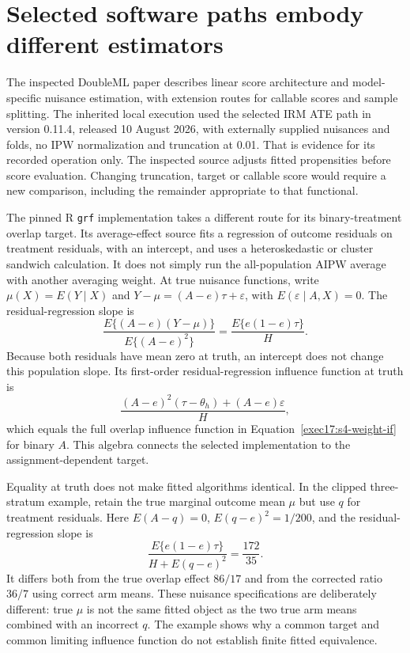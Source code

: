 \section{Selected software paths embody different estimators}
\label{exec17:s4-paths}

The inspected DoubleML paper describes linear score architecture and
model-specific nuisance estimation, with extension routes for callable scores
and sample splitting. The inherited local execution used the selected IRM
ATE path in version 0.11.4, released 10 August 2026, with externally supplied
nuisances and folds, no IPW normalization and truncation at 0.01. That is
evidence for its recorded operation only. The inspected source adjusts fitted
propensities before score evaluation. Changing truncation, target or callable
score would require a new comparison, including the remainder appropriate to
that functional.~\citep{doubleml2022,runtime_doubleml_scope,exec17_s4_paths}

The pinned R \texttt{grf} implementation takes a different route for its
binary-treatment overlap target. Its average-effect source fits a regression
of outcome residuals on treatment residuals, with an intercept, and uses a
heteroskedastic or cluster sandwich calculation. It does not simply run the
all-population AIPW average with another averaging weight. At true nuisance
functions, write $\mu(X)=E(Y\mid X)$ and
$Y-\mu=(A-e)\tau+\varepsilon$, with $E(\varepsilon\mid A,X)=0$.
The residual-regression slope is
\[
 \frac{E\{(A-e)(Y-\mu)\}}{E\{(A-e)^2\}}
       =\frac{E\{e(1-e)\tau\}}{H}.
\]
Because both residuals have mean zero at truth, an intercept does not change
this population slope. Its first-order residual-regression influence function
at truth is
\[
 \frac{(A-e)^2(\tau-\theta_h)+(A-e)\varepsilon}{H},
\]
which equals the full overlap influence function in
Equation~\eqref{exec17:s4-weight-if} for binary $A$.
This algebra connects the selected implementation to the assignment-dependent
target.~\citep{exec13_grf_rpath,exec17_s4_math}

Equality at truth does not make fitted algorithms identical. In the clipped
three-stratum example, retain the true marginal outcome mean $\mu$ but use
$q$ for treatment residuals. Here $E(A-q)=0$,
$E(q-e)^2=1/200$, and the residual-regression slope is
\[
 \frac{E\{e(1-e)\tau\}}{H+E(q-e)^2}=\frac{172}{35}.
\]
It differs both from the true overlap effect $86/17$ and from the corrected
ratio $36/7$ using correct arm means. These nuisance specifications are
deliberately different: true $\mu$ is not the same fitted object as the two
true arm means combined with an incorrect $q$. The example shows why a
common target and common limiting influence function do not establish
finite fitted equivalence.~\citep{exec17_s4_math}

